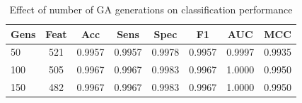 \begin{table}[htbp]
\centering
\caption{Effect of number of GA generations on classification performance}
\label{tab:t4_gens}
\begin{tabular}{lccccccc}
\toprule
Gens & Feat & Acc & Sens & Spec & F1 & AUC & MCC \\
\midrule
50 & 521 & 0.9957 & 0.9957 & 0.9978 & 0.9957 & 0.9997 & 0.9935 \\
100 & 505 & 0.9967 & 0.9967 & 0.9983 & 0.9967 & 1.0000 & 0.9950 \\
150 & 482 & 0.9967 & 0.9967 & 0.9983 & 0.9967 & 1.0000 & 0.9950 \\
\bottomrule
\end{tabular}
\end{table}